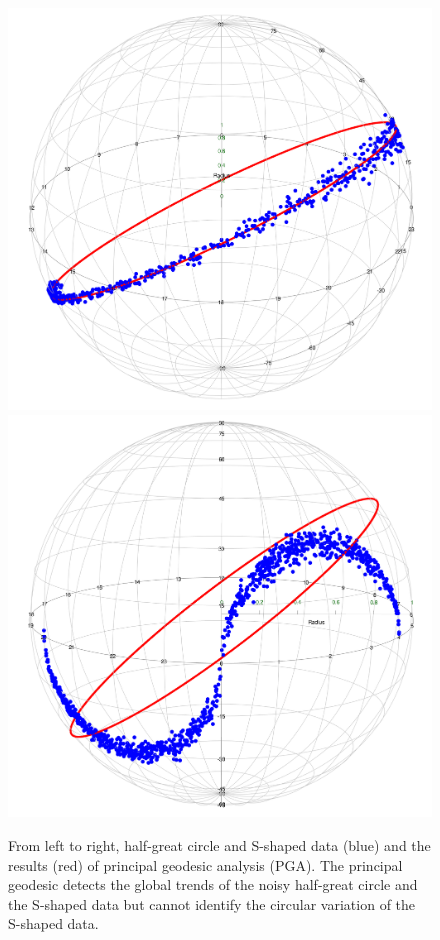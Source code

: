 \begin{figure}[!h]
    \centering
    \includegraphics[scale=0.13]{figures/PGA(halfcircle).png}
    \hspace{1cm}
    \includegraphics[scale=0.13]{figures/PGA(S).png}
    \caption{From left to right, half-great circle and S-shaped data (blue) and the results (red) of principal geodesic analysis (PGA). The principal geodesic detects the global trends of the noisy half-great circle and the S-shaped data but cannot identify the circular variation of the S-shaped data.}
    \label{fig:PGA}
\end{figure}

